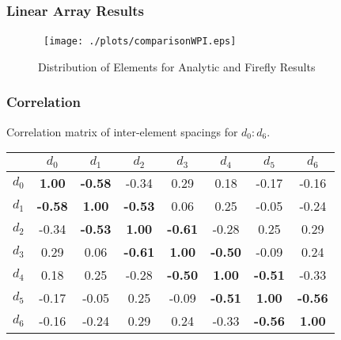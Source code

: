 \documentclass[...]{beamer}
\begin{document}
\begin{frame}
  \frametitle{Linear Array Results}

  \begin{figure}[H]
  \centerline{\hbox{ \hspace{0.0in}
      \texttt{[image: ./plots/comparisonWPI.eps]}
    }
  }
  \caption {Distribution of Elements for Analytic and Firefly Results}\label{fig:comparisonWPI}
  \end{figure}

\end{frame}

\begin{frame}
  \frametitle{Correlation}

  Correlation matrix of inter-element spacings for $d_0:d_6$.

  \begin{table}[H]\small
    \begin{center}
      \begin{tabular}{|c|ccccccc|}\hline
        & \textbf{$d_0$} & \textbf{$d_1$} & \textbf{$d_2$} & \textbf{$d_3$} & \textbf{$d_4$} & \textbf{$d_5$} & \textbf{$d_6$} \\ \hline
        \textbf{$d_0$} & \textbf{1.00} & \textbf{-0.58} & -0.34 & 0.29 & 0.18 & -0.17 & -0.16  \\
        \textbf{$d_1$} & \textbf{-0.58} & \textbf{1.00} & \textbf{-0.53} & 0.06 & 0.25 & -0.05 & -0.24 \\
        \textbf{$d_2$} & -0.34 & \textbf{-0.53} & \textbf{1.00} & \textbf{-0.61} & -0.28 & 0.25 & 0.29 \\
        \textbf{$d_3$} & 0.29 & 0.06 & \textbf{-0.61} & \textbf{1.00} & \textbf{-0.50} & -0.09 & 0.24 \\
        \textbf{$d_4$} & 0.18 & 0.25 & -0.28 & \textbf{-0.50} & \textbf{1.00} & \textbf{-0.51} & -0.33 \\
        \textbf{$d_5$} & -0.17 & -0.05 & 0.25 & -0.09 & \textbf{-0.51} & \textbf{1.00} & \textbf{-0.56} \\
        \textbf{$d_6$} & -0.16 & -0.24 & 0.29 & 0.24 & -0.33 & \textbf{-0.56} & \textbf{1.00} \\ \hline

      \end{tabular}
      \label{table:corr1}
    \end{center}
  \end{table}


\end{frame}
\end{document}
